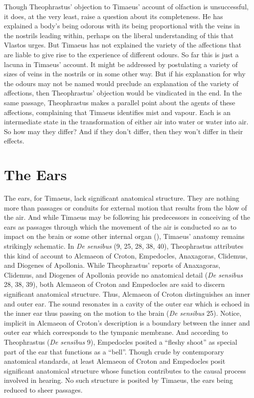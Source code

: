 Though Theophrastus' objection to Timaeus' account of olfaction is unsuccessful, it does, at the very least, raise a question  about its completeness. He has explained a body's being odorous with its being proportional with the veins in the nostrils leading within, perhaps on the liberal understanding of this that Vlastos urges. But Timaeus has not explained the variety of the affections that are liable to give rise to the experience of different odours. So far this is just a lacuna in Timaeus' account. It might be addressed by postulating a variety of sizes of veins in the nostrils or in some other way. But if his explanation for why the odours may not be named would preclude an explanation of the variety of affections, then Theophrastus' objection would be vindicated in the end. In the same passage, Theophrastus makes a parallel point about the agents of these affections, complaining that Timaeus identifies mist and vapour. Each is an intermediate state in the transformation of either air into water or water into air. So how may they differ? And if they don't differ, then they won't differ in their effects.


\section{The Ears} %
\label{sec:the_ears}

The ears, for Timaeus, lack significant anatomical structure. They are nothing more than passages or conduits for external motion that results from the blow of the air. And while Timaeus may be following his predecessors in conceiving of the ears as passages through which the movement of the air is conducted so as to impact on the brain or some other internal organ (\citealt[94]{Beare:1906uq}), Timaeus' anatomy remains strikingly schematic. In \emph{De sensibus} (9, 25, 28, 38, 40), Theophrastus attributes this kind of account to Alcmaeon of Croton, Empedocles, Anaxagoras, Clidemus, and Diogenes of Apollonia. While Theophrastus' reports of Anaxagoras, Clidemus, and Diogenes of Apollonia provide no anatomical detail (\emph{De sensibus} 28, 38, 39), both Alcmaeon of Croton and Empedocles are said to discern significant anatomical structure. Thus, Alcmaeon of Croton distinguishes an inner and outer ear. The sound resonates in a cavity of the outer ear which is echoed in the inner ear thus passing on the motion to the brain (\emph{De sensibus} 25). Notice, implicit in Alcmaeon of Croton's description is a boundary between the inner and outer ear which corresponds to the tympanic membrane. And according to Theophrastus (\emph{De sensibus} 9), Empedocles posited a ``fleshy shoot'' as special part of the ear that functions as a ``bell''. Though crude by contemporary anatomical standards, at least Alcmaeon of Croton and Empedocles posit significant anatomical structure whose function contributes to the causal process involved in hearing. No such structure is posited by Timaeus, the ears being reduced to sheer passages.

